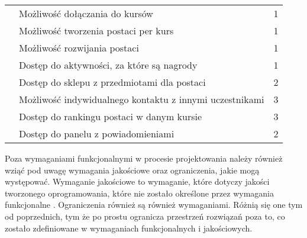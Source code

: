 \begin{table}[h]
\begin{tabular}{|l|l|c|}
	& Możliwość dołączania do kursów & 1
		\\ \cline{2-3} 
	& Możliwość tworzenia postaci per kurs & 1
		\\ \cline{2-3} 
	& Możliwość rozwijania postaci & 1
		\\ \cline{2-3}
	& Dostęp do aktywności, za które są nagrody & 1
		\\ \cline{2-3}
	& Dostęp do sklepu z przedmiotami dla postaci & 2
		\\ \cline{2-3}
	& Możliwość indywidualnego kontaktu z innymi uczestnikami & 3
		\\ \cline{2-3}
	& Dostęp do rankingu postaci w danym kursie & 3
		\\ \cline{2-3}
	& Dostęp do panelu z powiadomieniami & 2
		\\ \hline


\end{tabular}
\end{table}

Poza wymaganiami funkcjonalnymi w procesie projektowania należy również wziąć pod uwagę
wymagania jakościowe oraz ograniczenia, jakie mogą występować. Wymaganie jakościowe to wymaganie, które dotyczy jakości tworzonego oprogramowania, które nie zostało określone przez wymagania funkcjonalne \cite{wolskipro}. Ograniczenia również są również wymaganiami. Różnią się one tym od poprzednich, tym że po prostu ogranicza przestrzeń rozwiązań poza to, co zostało zdefiniowane w wymaganiach funkcjonalnych i jakościowych. 

